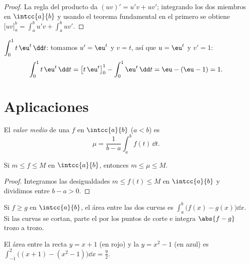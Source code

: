 \begin{proof}
La regla del producto da $(uv)' = u'v + uv'$; integrando los dos miembros
en $\intcc{a}{b}$ y usando el teorema fundamental en el primero se obtiene
$\bigl[uv\bigr]_a^b = \int_a^b u'v + \int_a^b uv'$.
\end{proof}

\begin{example}\label{ex:g12:integ:ibp}
$\displaystyle\int_0^1 t\,\eu^{t}\,\dd t$: tomamos $u' = \eu^t$ y $v = t$,
así que $u = \eu^t$ y $v' = 1$:
\[
\int_0^1 t\,\eu^t\,\dd t = \bigl[t\,\eu^t\bigr]_0^1 - \int_0^1 \eu^t\,\dd t
= \eu - (\eu - 1) = 1 .
\]
\end{example}

\section{Aplicaciones}

\begin{definition}\label{def:g12:integ:mean}
El \emph{valor medio} de una   $f$ en
$\intcc{a}{b}$ ($a<b$) es
\[
\mu = \frac{1}{b-a}\int_a^b f(t)\,\dd t .
\]
\end{definition}

\begin{proposition}\label{prop:g12:integ:meanbounds}
Si $m \leq f \leq M$ en $\intcc{a}{b}$, entonces $m \leq \mu \leq M$.
\end{proposition}

\begin{proof}
Integramos las desigualdades $m \leq f(t) \leq M$ en $\intcc{a}{b}$ y
dividimos entre $b - a > 0$.
\end{proof}

\begin{method}\label{met:g12:integ:areabetween}
Si $f \geq g$ en $\intcc{a}{b}$, el área entre las dos curvas es
$\int_a^b \bigl(f(x) - g(x)\bigr)\dd x$. Si las curvas se cortan, parte el
 por los puntos de corte e integra $\abs{f - g}$ trozo a trozo.
\end{method}

\begin{omfigure}

{\small El área entre la recta $y = x + 1$ (en rojo) y la 
$y = x^2 - 1$ (en azul) es
$\int_{-1}^{2}\bigl((x+1) - (x^2-1)\bigr)\dd x = \frac92$.}
\end{omfigure}

